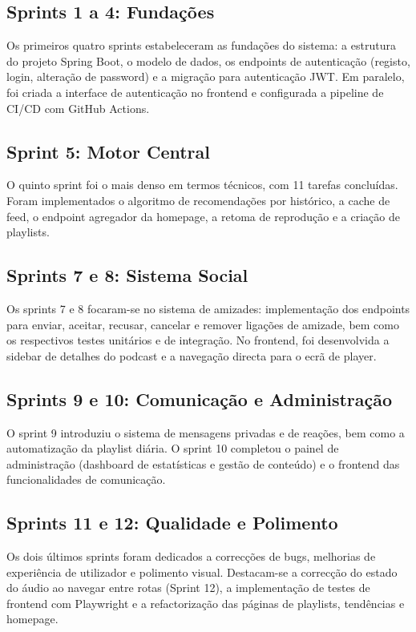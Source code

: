 \documentclass[12pt, a4paper]{report}
\begin{document}
\subsection{Sprints 1 a 4: Fundações}

Os primeiros quatro sprints estabeleceram as fundações do sistema: a estrutura
do projeto Spring Boot, o modelo de dados, os endpoints de autenticação (registo,
login, alteração de password) e a migração para autenticação JWT. Em paralelo,
foi criada a interface de autenticação no frontend e configurada a pipeline de
CI/CD com GitHub Actions.

\subsection{Sprint 5: Motor Central}

O quinto sprint foi o mais denso em termos técnicos, com 11 tarefas concluídas.
Foram implementados o algoritmo de recomendações por histórico, a cache de feed,
o endpoint agregador da homepage, a retoma de reprodução e a criação de playlists.

\subsection{Sprints 7 e 8: Sistema Social}

Os sprints 7 e 8 focaram-se no sistema de amizades: implementação dos endpoints
para enviar, aceitar, recusar, cancelar e remover ligações de amizade, bem como
os respectivos testes unitários e de integração. No frontend, foi desenvolvida
a sidebar de detalhes do podcast e a navegação directa para o ecrã de player.

\subsection{Sprints 9 e 10: Comunicação e Administração}

O sprint 9 introduziu o sistema de mensagens privadas e de reações, bem como a
automatização da playlist diária. O sprint 10 completou o painel de administração
(dashboard de estatísticas e gestão de conteúdo) e o frontend das funcionalidades
de comunicação.

\subsection{Sprints 11 e 12: Qualidade e Polimento}

Os dois últimos sprints foram dedicados a correcções de bugs, melhorias de
experiência de utilizador e polimento visual. Destacam-se a correcção do estado
do áudio ao navegar entre rotas (Sprint 12), a implementação de testes de
frontend com Playwright e a refactorização das páginas de playlists, tendências
e homepage.
\end{document}
